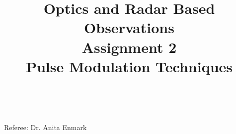 \documentclass{article}
\title{\textbf {Optics and Radar Based Observations} \\ Assignment 2\\ Pulse Modulation Techniques} %
\author{\authorivan\\\authoranu}
\begin{document}
\maketitle %

\centerline{Referee: Dr. Anita Enmark}


\setlength\parindent{0pt} %

\renewcommand{\labelenumi}{\alph{enumi}.} %
\clearpage

\tableofcontents

\listoffigures

\clearpage

\end{document}
